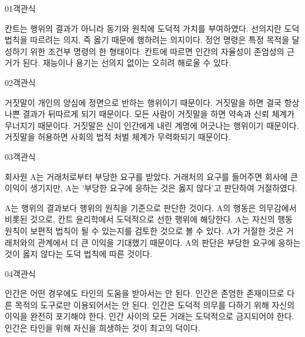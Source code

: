 \documentclass[fs85,seriesWit]{korfarm-base}
\begin{document}
\kfBeginMC
\begin{kfQBlock}{01}{객관식}
\begin{kfChoices}
\kfChoice 칸트는 행위의 결과가 아니라 동기와 원칙에 도덕적 가치를 부여하였다.
\kfChoice 선의지란 도덕 법칙을 따르려는 의지, 즉 옳기 때문에 행하려는 의지이다.
\kfChoice 정언 명령은 특정 목적을 달성하기 위한 조건부 명령의 한 형태이다.
\kfChoice 칸트에 따르면 인간의 자율성이 존엄성의 근거가 된다.
\kfChoice 재능이나 용기는 선의지 없이는 오히려 해로울 수 있다.
\end{kfChoices}
\end{kfQBlock}

\begin{kfQBlock}{02}{객관식}
\begin{kfChoices}
\kfChoice 거짓말이 개인의 양심에 정면으로 반하는 행위이기 때문이다.
\kfChoice 거짓말을 하면 결국 항상 나쁜 결과가 뒤따르게 되기 때문이다.
\kfChoice 모든 사람이 거짓말을 하면 약속과 신뢰 체계가 무너지기 때문이다.
\kfChoice 거짓말은 신이 인간에게 내린 계명에 어긋나는 행위이기 때문이다.
\kfChoice 거짓말을 허용하면 사회의 법적 처벌 체계가 무력화되기 때문이다.
\end{kfChoices}
\end{kfQBlock}

\begin{kfQBlock}{03}{객관식}
\begin{kfEvidence}회사원 A는 거래처로부터 부당한 요구를 받았다. 거래처의 요구를 들어주면 회사에 큰 이익이 생기지만, A는 '부당한 요구에 응하는 것은 옳지 않다'고 판단하여 거절하였다.\end{kfEvidence}
\begin{kfChoices}
\kfChoice A는 행위의 결과보다 행위의 원칙을 기준으로 판단한 것이다.
\kfChoice A의 행동은 의무감에서 비롯된 것으로, 칸트 윤리학에서 도덕적으로 선한 행위에 해당한다.
\kfChoice A는 자신의 행동 원칙이 보편적 법칙이 될 수 있는지를 검토한 것으로 볼 수 있다.
\kfChoice A가 거절한 것은 거래처와의 관계에서 더 큰 이익을 기대했기 때문이다.
\kfChoice A의 판단은 부당한 요구에 응하는 것이 옳지 않다는 도덕 법칙에 따른 것이다.
\end{kfChoices}
\end{kfQBlock}

\begin{kfQBlock}{04}{객관식}
\begin{kfChoices}
\kfChoice 인간은 어떤 경우에도 타인의 도움을 받아서는 안 된다.
\kfChoice 인간은 존엄한 존재이므로 다른 목적의 도구로만 이용되어서는 안 된다.
\kfChoice 인간은 도덕적 의무를 다하기 위해 자신의 이익을 완전히 포기해야 한다.
\kfChoice 인간 사이의 모든 거래는 도덕적으로 금지되어야 한다.
\kfChoice 인간은 타인을 위해 자신을 희생하는 것이 최고의 덕이다.
\end{kfChoices}
\end{kfQBlock}
\end{document}
